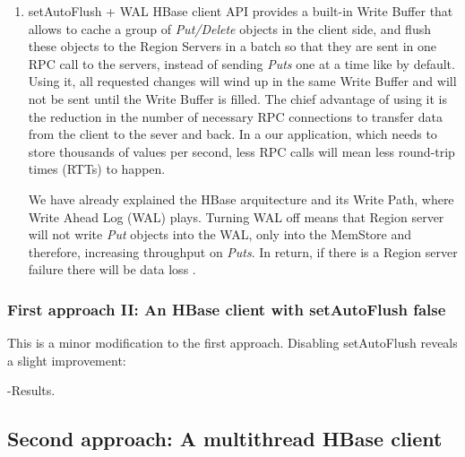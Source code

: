 \begin{enumerate}
 \item setAutoFlush + WAL
\bigskip
HBase client API provides a built-in Write Buffer that allows to cache a group of \textit{Put/Delete} objects in the client side, and flush these objects to the Region Servers in a batch so that they are sent in one RPC call to the servers, instead of sending \textit{Puts} one at a time like by default. Using it, all requested changes will wind up in the same Write Buffer and will not be sent until the Write Buffer is filled. The chief advantage of using it is the reduction in the number of necessary RPC connections to transfer data from the client to the sever and back. In a our application, which needs to store thousands of values per second, less RPC calls will mean less round-trip times (RTTs) to happen.
\par
{}
\par
We have already explained the HBase arquitecture and its Write Path, where Write Ahead Log (WAL) plays. Turning WAL off means that Region server will not write \textit{Put} objects into the WAL, only into the MemStore and therefore, increasing throughput on \textit{Puts}. In return, if there is a Region server failure there will be data loss \cite{ApacheHBaseWAL}.


\end{enumerate}




\subsubsection{First approach II: An HBase client with setAutoFlush false}

This is a minor modification to the first approach. Disabling setAutoFlush reveals a slight improvement:

-Results.


\subsection{Second approach: A multithread HBase client}

